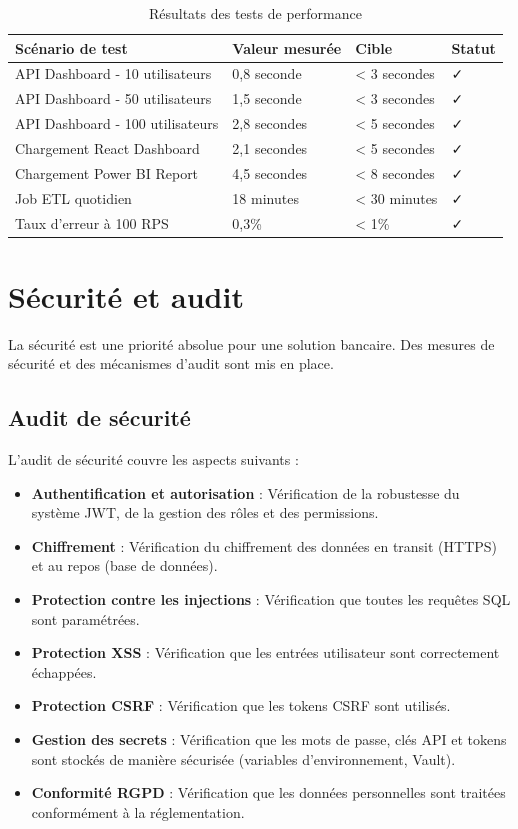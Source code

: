 \begin{table}[H]
\centering
\begin{tabular}{|p{4cm}|p{3.5cm}|p{3.5cm}|p{2.5cm}|}
\hline
\textbf{Scénario de test} & \textbf{Valeur mesurée} & \textbf{Cible} & \textbf{Statut} \\
\hline
API Dashboard - 10 utilisateurs & 0,8 seconde & < 3 secondes & ✓ \\
\hline
API Dashboard - 50 utilisateurs & 1,5 seconde & < 3 secondes & ✓ \\
\hline
API Dashboard - 100 utilisateurs & 2,8 secondes & < 5 secondes & ✓ \\
\hline
Chargement React Dashboard & 2,1 secondes & < 5 secondes & ✓ \\
\hline
Chargement Power BI Report & 4,5 secondes & < 8 secondes & ✓ \\
\hline
Job ETL quotidien & 18 minutes & < 30 minutes & ✓ \\
\hline
Taux d'erreur à 100 RPS & 0,3\% & < 1\% & ✓ \\
\hline
\end{tabular}
\caption{Résultats des tests de performance}
\label{tab:performance-results}
\end{table}

\section{Sécurité et audit}
\label{sec:sprint8-securite}

La sécurité est une priorité absolue pour une solution bancaire. Des mesures de sécurité et des mécanismes d'audit sont mis en place.

\subsection{Audit de sécurité}

L'audit de sécurité couvre les aspects suivants :

\begin{itemize}
    \item \textbf{Authentification et autorisation} : Vérification de la robustesse du système JWT, de la gestion des rôles et des permissions.
    \item \textbf{Chiffrement} : Vérification du chiffrement des données en transit (HTTPS) et au repos (base de données).
    \item \textbf{Protection contre les injections} : Vérification que toutes les requêtes SQL sont paramétrées.
    \item \textbf{Protection XSS} : Vérification que les entrées utilisateur sont correctement échappées.
    \item \textbf{Protection CSRF} : Vérification que les tokens CSRF sont utilisés.
    \item \textbf{Gestion des secrets} : Vérification que les mots de passe, clés API et tokens sont stockés de manière sécurisée (variables d'environnement, Vault).
    \item \textbf{Conformité RGPD} : Vérification que les données personnelles sont traitées conformément à la réglementation.
\end{itemize}

